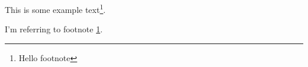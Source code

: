\documentclass{article}
\begin{document}
  This is some example text\footnote{\label{myfootnote}Hello footnote}.

  I'm referring to footnote \ref{myfootnote}.
\end{document}
